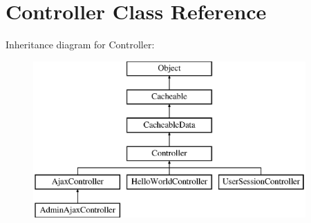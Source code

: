 \hypertarget{class_controller}{\section{Controller Class Reference}
\label{class_controller}
}
Inheritance diagram for Controller\-:\begin{figure}[H]
\begin{center}
\leavevmode
\includegraphics[height=6.000000cm]{class_controller}
\end{center}
\end{figure}
